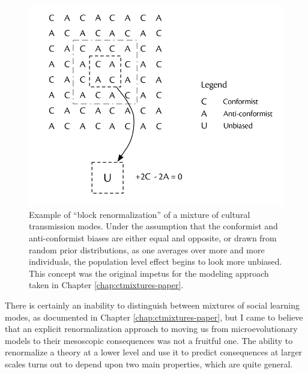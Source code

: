 \begin{figure}[ht!]
  \centering
  \includegraphics[scale=0.5]{graphics/conclusion/renormalizing-ct-modes.pdf}
  \caption{Example of ``block renormalization'' of a mixture of cultural transmission modes.  Under the assumption that the conformist and anti-conformist biases are either equal and opposite, or drawn from random prior distributions, as one averages over more and more individuals, the population level effect begins to look more unbiased.  This concept was the original impetus for the modeling approach taken in Chapter \ref{chap:ctmixtures-paper}.}
  \label{conc:fig:renormalizing-ct}
\end{figure}

There is certainly an inability to distinguish between mixtures of social learning modes, as documented in Chapter \ref{chap:ctmixtures-paper}, but I came to believe that an explicit renormalization approach to moving us from microevolutionary models to their mesoscopic consequences was not a fruitful one.  The ability to renormalize a theory at a lower level and use it to predict consequences at larger scales turns out to depend upon two main properties, which are quite general.  

